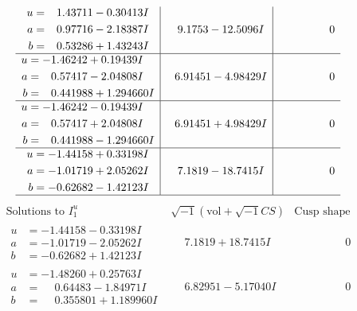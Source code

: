 \documentclass[1p]{elsarticle_modified}
\theoremstyle{definition}
\newcommand{\I}{\sqrt{-1}}
\begin{document}
$$\begin{array}{c|c|c}
\begin{aligned}
u &= \phantom{-}1.43711 - 0.30413 I \\
a &= \phantom{-}0.97716 - 2.18387 I \\
b &= \phantom{-}0.53286 + 1.43243 I\end{aligned}
 & \phantom{-}9.1753 - 12.5096 I & \phantom{-0.000000 } 0 \\ \hline\begin{aligned}
u &= -1.46242 + 0.19439 I \\
a &= \phantom{-}0.57417 - 2.04808 I \\
b &= \phantom{-}0.441988 + 1.294660 I\end{aligned}
 & \phantom{-}6.91451 - 4.98429 I & \phantom{-0.000000 } 0 \\ \hline\begin{aligned}
u &= -1.46242 - 0.19439 I \\
a &= \phantom{-}0.57417 + 2.04808 I \\
b &= \phantom{-}0.441988 - 1.294660 I\end{aligned}
 & \phantom{-}6.91451 + 4.98429 I & \phantom{-0.000000 } 0 \\ \hline\begin{aligned}
u &= -1.44158 + 0.33198 I \\
a &= -1.01719 + 2.05262 I \\
b &= -0.62682 - 1.42123 I\end{aligned}
 & \phantom{-}7.1819 - 18.7415 I & \phantom{-0.000000 } 0\\
 \hline 
 \end{array}$$\newpage$$\begin{array}{c|c|c}  
\text{Solutions to }I^u_{1}& \I (\text{vol} + \sqrt{-1}CS) & \text{Cusp shape}\\
 \hline 
\begin{aligned}
u &= -1.44158 - 0.33198 I \\
a &= -1.01719 - 2.05262 I \\
b &= -0.62682 + 1.42123 I\end{aligned}
 & \phantom{-}7.1819 + 18.7415 I & \phantom{-0.000000 } 0 \\ \hline\begin{aligned}
u &= -1.48260 + 0.25763 I \\
a &= \phantom{-}0.64483 - 1.84971 I \\
b &= \phantom{-}0.355801 + 1.189960 I\end{aligned}
 & \phantom{-}6.82951 - 5.17040 I & \phantom{-0.000000 } 0 \\ \hline\begin{aligned}

\end{aligned}
\end{array}$$
\end{document}
